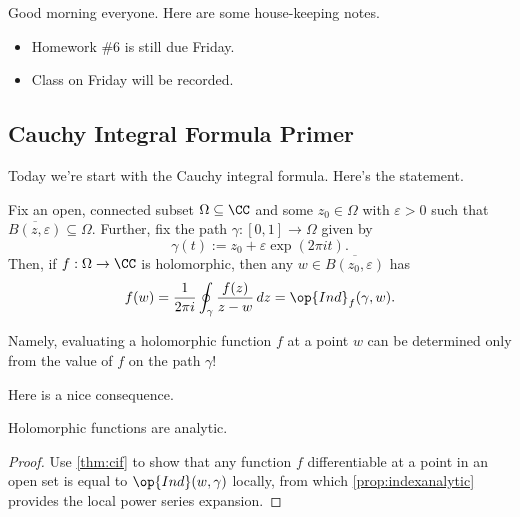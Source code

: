 
Good morning everyone. Here are some house-keeping notes.
\begin{itemize}
	\item Homework \#6 is still due Friday.
	\item Class on Friday will be recorded.
\end{itemize}

\subsection{Cauchy Integral Formula Primer}
Today we're start with the Cauchy integral formula. Here's the statement.
\begin{theorem} \label{thm:cif}
	Fix an open, connected subset $\Omega\subseteq\CC$ and some $z_0\in\Omega$ with $\varepsilon>0$ such that $\overline{B(z,\varepsilon)}\subseteq\Omega$. Further, fix the path $\gamma:[0,1]\to\Omega$ given by
	\[\gamma(t):=z_0+\varepsilon\exp(2\pi it).\]
	Then, if $f:\Omega\to\CC$ is holomorphic, then any $w\in\overline{B(z_0,\varepsilon)}$ has
	\[f(w)=\frac1{2\pi i}\oint_\gamma\frac{f(z)}{z-w}\,dz=\op{Ind}_f(\gamma,w).\]
\end{theorem}
Namely, evaluating a holomorphic function $f$ at a point $w$ can be determined only from the value of $f$ on the path $\gamma$!

Here is a nice consequence.
\begin{corollary}
	Holomorphic functions are analytic.
\end{corollary}
\begin{proof}
	Use \autoref{thm:cif} to show that any function $f$ differentiable at a point in an open set is equal to $\op{Ind}(w,\gamma)$ locally, from which \autoref{prop:indexanalytic} provides the local power series expansion.
\end{proof}

